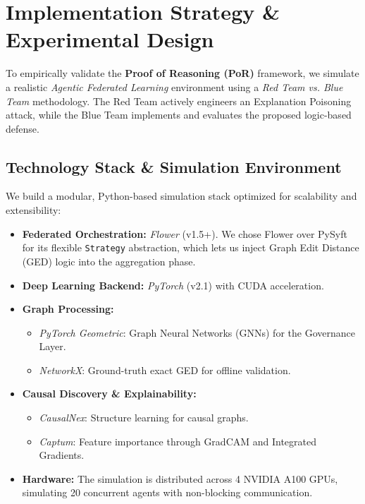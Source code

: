 \documentclass[journal]{IEEEtran}
\begin{document}
\newpage
\section{Implementation Strategy \& Experimental Design}

To empirically validate the \textbf{Proof of Reasoning (PoR)} framework, we simulate a realistic \emph{Agentic Federated Learning} environment using a \emph{Red Team vs. Blue Team} methodology. The Red Team actively engineers an Explanation Poisoning attack, while the Blue Team implements and evaluates the proposed logic-based defense.

\subsection{Technology Stack \& Simulation Environment}

We build a modular, Python-based simulation stack optimized for scalability and extensibility:

\begin{itemize}
\item \textbf{Federated Orchestration:} \emph{Flower} \cite{beutel2020flower} (v1.5+). We chose Flower over PySyft for its flexible \texttt{Strategy} abstraction, which lets us inject Graph Edit Distance (GED) logic into the aggregation phase.
\item \textbf{Deep Learning Backend:} \emph{PyTorch} \cite{pytorch} (v2.1) with CUDA acceleration.
\item \textbf{Graph Processing:}
 \begin{itemize}
\item \emph{PyTorch Geometric}: Graph Neural Networks (GNNs) for the Governance Layer.
\item \emph{NetworkX}: Ground-truth exact GED for offline validation. \end{itemize}
\item \textbf{Causal Discovery \& Explainability:}
 \begin{itemize}
\item \emph{CausalNex}: Structure learning for causal graphs.
\item \emph{Captum}: Feature importance through GradCAM and Integrated Gradients. \end{itemize}
\item \textbf{Hardware:} The simulation is distributed across 4 NVIDIA A100 GPUs, simulating 20 concurrent agents with non-blocking communication. \end{itemize}
\end{document}
